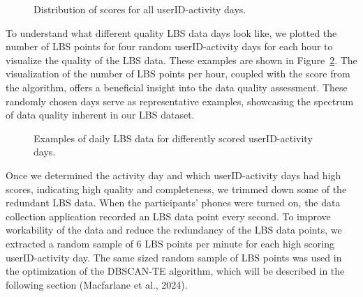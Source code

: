\documentclass[
  letterpaper,
  number,
  review,
  3p]{elsarticle}
\begin{document}
\begin{figure}[H]


\caption{\label{fig-allScoredDays}Distribution of scores for all
userID-activity days.}

\end{figure}%

To understand what different quality LBS data days look like, we plotted
the number of LBS points for four random userID-activity days for each
hour to visualize the quality of the LBS data. These examples are shown
in Figure~\ref{fig-exampScoredDays}. The visualization of the number of
LBS points per hour, coupled with the score from the algorithm, offers a
beneficial insight into the data quality assessment. These randomly
chosen days serve as representative examples, showcasing the spectrum of
data quality inherent in our LBS dataset.

\begin{figure}[H]


\caption{\label{fig-exampScoredDays}Examples of daily LBS data for
differently scored userID-activity days.}

\end{figure}%

Once we determined the activity day and which userID-activity days had
high scores, indicating high quality and completeness, we trimmed down
some of the redundant LBS data. When the participants' phones were
turned on, the data collection application recorded an LBS data point
every second. To improve workability of the data and reduce the
redundancy of the LBS data points, we extracted a random sample of 6 LBS
points per minute for each high scoring userID-activity day. The same
sized random sample of LBS points was used in the optimization of the
DBSCAN-TE algorithm, which will be described in the following section
(Macfarlane et al., 2024).
\end{document}
